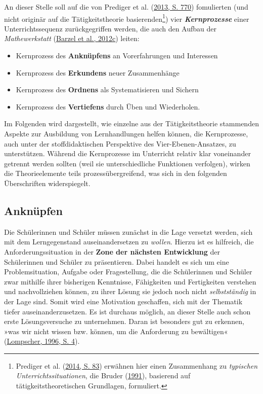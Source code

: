 \documentclass[
]{scrbook}
\providecommand{\tightlist}{%
  \setlength{\itemsep}{0pt}\setlength{\parskip}{0pt}}
\theoremstyle{definition}
\theoremstyle{definition}
\theoremstyle{definition}
\theoremstyle{definition}
\theoremstyle{remark}
\begin{document}
An dieser Stelle soll auf die von Prediger et al. (\protect\hyperlink{ref-Prediger2013}{2013, S. 770}) fomulierten (und nicht originär auf die Tätigkeitstheorie basierenden\footnote{Prediger et al. (\protect\hyperlink{ref-Prediger2014}{2014, S. 83}) erwähnen hier einen Zusammenhang zu \emph{typischen Unterrichtssituationen}, die Bruder (\protect\hyperlink{ref-Bruder1991}{1991}), basierend auf tätigkeitstheoretischen Grundlagen, formuliert.}) vier \textbf{\emph{Kernprozesse}} einer Unterrichtssequenz zurückgegriffen werden, die auch den Aufbau der \emph{Mathewerkstatt} (\protect\hyperlink{ref-Barzel2012}{Barzel et al., 2012c}) leiten:

\begin{itemize}
\tightlist
\item
  Kernprozess des \textbf{Anknüpfens} an Vorerfahrungen und Interessen
\item
  Kernprozess des \textbf{Erkundens} neuer Zusammenhänge
\item
  Kernprozess des \textbf{Ordnens} als Systematisieren und Sichern
\item
  Kernprozess des \textbf{Vertiefens} durch Üben und Wiederholen.
\end{itemize}

Im Folgenden wird dargestellt, wie einzelne aus der Tätigkeitstheorie stammenden Aspekte zur Ausbildung von Lernhandlungen helfen können, die Kernprozesse, auch unter der stoffdidaktischen Perspektive des Vier-Ebenen-Ansatzes, zu unterstützen. Während die Kernprozesse im Unterricht relativ klar voneinander getrennt werden sollten (weil sie unterschiedliche Funktionen verfolgen), wirken die Theorieelemente teils prozessübergreifend, was sich in den folgenden Überschriften widerspiegelt.

\hypertarget{anknuepfen}{%
\subsection{Anknüpfen}\label{anknuepfen}}

Die Schülerinnen und Schüler müssen zunächst in die Lage versetzt werden, sich mit dem Lerngegenstand auseinandersetzen zu \emph{wollen}. Hierzu ist es hilfreich, die Anforderungssituation in der \textbf{Zone der nächsten Entwicklung} der Schülerinnen und Schüler zu präsentieren. Dabei handelt es sich um eine Problemsituation, Aufgabe oder Fragestellung, die die Schülerinnen und Schüler zwar mithilfe ihrer bisherigen Kenntnisse, Fähigkeiten und Fertigkeiten verstehen und nachvollziehen können, zu ihrer Lösung sie jedoch noch nicht \emph{selbstständig} in der Lage sind. Somit wird eine Motivation geschaffen, sich mit der Thematik tiefer auseinanderzusetzen. Es ist durchaus möglich, an dieser Stelle auch schon erste Lösungsversuche zu unternehmen. Daran ist besonders gut zu erkennen, »was wir nicht wissen bzw. können, um die Anforderung zu bewältigen« (\protect\hyperlink{ref-Lompscher1996}{Lompscher, 1996, S. 4}).
\end{document}
